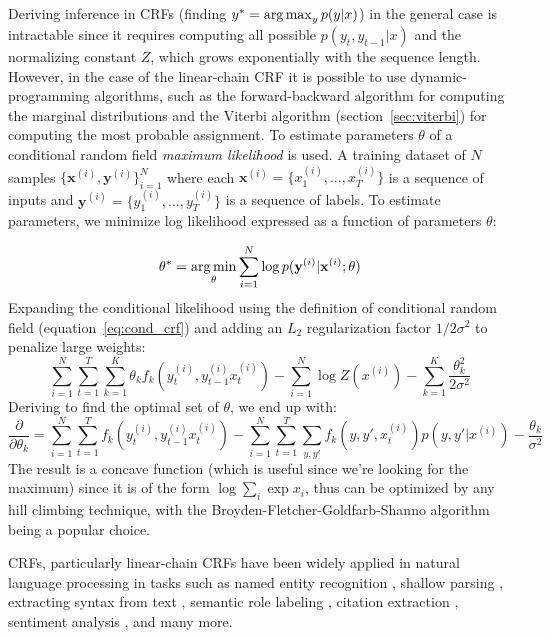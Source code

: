 Deriving inference in CRFs (finding 
$y^* = \operatorname*{arg\,max}_y p(y | x)$) 
in the general case is intractable since 
it requires computing all possible $p(y_t, y_{t - 1} | x)$ 
and the normalizing constant $Z$, which grows exponentially with the 
sequence length. 
However, in the case of the linear-chain CRF it is possible to 
use dynamic-programming algorithms, such as the
forward-backward algorithm \citep{devijver1985baum} 
for computing the marginal distributions and 
the Viterbi algorithm
(section~\ref{sec:viterbi}) for computing
the most probable assignment. 
To estimate parameters $\theta$ of a conditional 
random field \textit{maximum likelihood} is used.
A training dataset of $N$ samples $\{\mathbf{x}^{(i)}, \mathbf{y}^{(i)}\}^{N}_{i=1}$
where each $\mathbf{x}^{(i)} = \{x_{1}^{(i)}, \dots, x_{T}^{(i)}\}$
is a sequence of inputs
and $\mathbf{y}^{(i)} = \{y_{1}^{(i)}, \dots, y_{T}^{(i)}\}$ is 
a sequence of labels. To estimate parameters, we
minimize log likelihood expressed as a function of parameters $\theta$:

$$
\theta^{*} = \operatorname*{arg\,min}_{\theta} \sum_{i=1}^{N} \log p(\mathbf{y}^{(i)} | \mathbf{x}^{(i)} ; \theta)
$$
Expanding the conditional likelihood using the definition of conditional random field
(equation~\ref{eq:cond_crf}) and adding an $L_2$ regularization factor $1/2 \sigma^2$ 
to penalize large weights:
$$
\sum_{i=1}^{N} \sum_{t=1}^{T} \sum_{k=1}^{K} \theta_k f_k (y_{t}^{(i)}, y_{t - 1}^{(i)} x_{t}^{(i)}) 
- \sum_{i=1}^N \log Z(x^{(i)}) - \sum_{k=1}^{K} \frac{\theta_{k}^{2}}{2 \sigma^2}
$$
Deriving to find the optimal set of $\theta$, we end up with:
$$
\frac{\partial }{\partial \theta_k} = \sum_{i=1}^{N} \sum_{t=1}^{T} f_k (y_{t}^{(i)}, y_{t - 1}^{(i)} x_{t}^{(i)}) 
- \sum_{i=1}^{N} \sum_{t=1}^{T} \sum_{y, y'} f_k (y, y', x_{t}^{(i)}) p(y, y'|x^{(i)}) - \frac{\theta_k}{\sigma^2}
$$
The result is a concave function (which is useful since we're looking for the 
maximum) since it is of the form $\log \sum_i \exp x_i$, thus can be optimized by
any hill climbing technique, with the 
Broyden-Fletcher-Goldfarb-Shanno algorithm \citep{liu1989limited} being a popular 
choice. 

CRFs, particularly linear-chain CRFs
have been widely applied in natural language processing in tasks such as
named entity recognition \citep{liu2011recognizing}, shallow parsing \citep{sha2003shallow}, 
extracting syntax from text \citep{taskar2004max}, 
semantic role labeling \citep{cohn2005semantic}, citation extraction \citep{wellner2004integrated}, 
sentiment analysis \citep{patra2014ju_cse}, and many more. 

